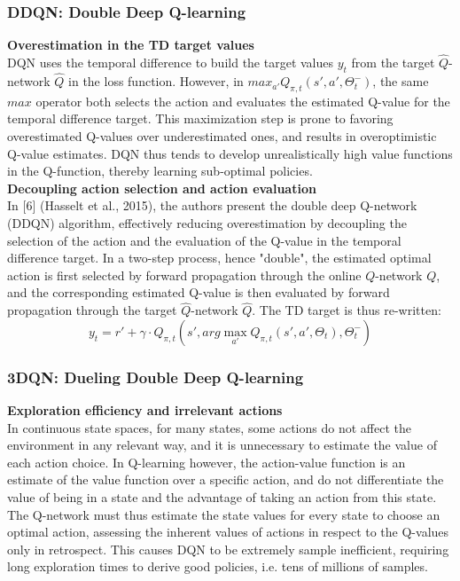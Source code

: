 \subsubsection{DDQN: Double Deep Q-learning} \label{basics}

\textbf{Overestimation in the TD target values} \\
DQN uses the temporal difference to build the target values $y_t$ from the target $\hat{Q}$-network $\hat{Q}$ in the loss function. However, in $max_{a'}Q_{\pi,t}(s',a',\Theta^-_t)$, the same $max$ operator both selects the action and evaluates the estimated Q-value for the temporal difference target. This maximization step is prone to favoring overestimated Q-values over underestimated ones, and results in overoptimistic Q-value estimates. DQN thus tends to develop unrealistically high value functions in the Q-function, thereby learning sub-optimal policies. \\

\textbf{Decoupling action selection and action evaluation} \\
In [6] (Hasselt et al., 2015), the authors present the double deep Q-network (DDQN) algorithm, effectively reducing overestimation by decoupling the selection of the action and the evaluation of the Q-value in the temporal difference target. In a two-step process, hence "double", the estimated optimal action is first selected by forward propagation through the online $Q$-network $Q$, and the corresponding estimated Q-value is then evaluated by forward propagation through the target $\hat{Q}$-network $\hat{Q}$. The TD target is thus re-written:
\[ y_t = r' + \gamma \cdot Q_{\pi,t}(s',arg\max_{a'}Q_{\pi,t}(s',a',\Theta_t),\Theta^-_t) \]

\subsubsection{3DQN: Dueling Double Deep Q-learning} \label{basics}

\textbf{Exploration efficiency and irrelevant actions} \\
In continuous state spaces, for many states, some actions do not affect the environment in any relevant way, and it is unnecessary to estimate the value of each action choice. In Q-learning however, the action-value function is an estimate of the value function over a specific action, and do not differentiate the value of being in a state and the advantage of taking an action from this state. The Q-network must thus estimate the state values for every state to choose an optimal action, assessing the inherent values of actions in respect to the Q-values only in retrospect. This causes DQN to be extremely sample inefficient, requiring long exploration times to derive good policies, i.e. tens of millions of samples. \\

